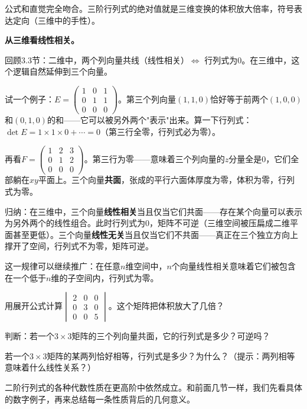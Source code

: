 公式和直觉完全吻合。三阶行列式的绝对值就是三维变换的体积放大倍率，符号表达定向（三维中的手性）。

\vspace{0.2cm}
\noindent\textbf{从三维看线性相关。}

回顾3.3节：二维中，两个列向量共线（线性相关）$\Longleftrightarrow$ 行列式为$0$。在三维中，这个逻辑自然延伸到三个向量。

试一个例子：$E=\begin{pmatrix}1&0&1\\0&1&1\\0&0&0\end{pmatrix}$。第三个列向量$(1,1,0)$恰好等于前两个$(1,0,0)$和$(0,1,0)$的和——它可以被另外两个"表示"出来。算一下行列式：$\det E=1\times1\times0+\cdots=0$（第三行全零，行列式必为零）。

再看$F=\begin{pmatrix}1&2&3\\0&1&2\\0&0&0\end{pmatrix}$。第三行为零——意味着三个列向量的$z$分量全是$0$，它们全部躺在$xy$平面上。三个向量\textbf{共面}，张成的平行六面体厚度为零，体积为零，行列式为零。

归纳：在三维中，三个向量\textbf{线性相关}当且仅当它们共面——存在某个向量可以表示为另外两个的线性组合。此时行列式为$0$，矩阵不可逆（三维空间被压扁成二维平面甚至更低）。三个向量\textbf{线性无关}当且仅当它们不共面——真正在三个独立方向上撑开了空间，行列式不为零，矩阵可逆。

这一规律可以继续推广：在任意$n$维空间中，$n$个向量线性相关意味着它们被包含在一个低于$n$维的子空间内，行列式为零。

\begin{exercise}
\item 用展开公式计算$\begin{vmatrix}2&0&0\\0&3&0\\0&0&5\end{vmatrix}$。这个矩阵把体积放大了几倍？
\item 判断：若一个$3\times3$矩阵的三个列向量共面，它的行列式是多少？可逆吗？
\item 若一个$3\times3$矩阵的某两列恰好相等，行列式是多少？为什么？（提示：两列相等意味着什么线性关系？）
\end{exercise}


二阶行列式的各种代数性质在更高阶中依然成立。和前面几节一样，我们先看具体的数字例子，再来总结每一条性质背后的几何意义。

